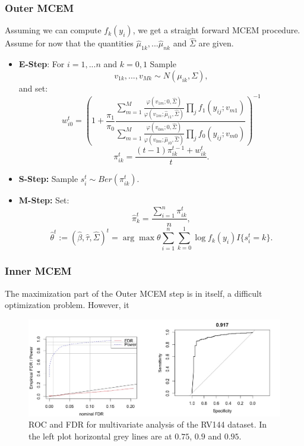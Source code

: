 \documentclass{article}\usepackage[]{graphicx}\usepackage[]{color}
\makeatletter
\def\maxwidth{ %
  \ifdim\Gin@nat@width>\linewidth
    \linewidth
  \else
    \Gin@nat@width
  \fi
}
\makeatother
\begin{document}
\subsubsection{Outer MCEM}
Assuming we can compute $f_k(y_i)$, we get a straight forward MCEM procedure. Assume for now that the quantities $\hat\mu_{1k},...\hat\mu_{nk}$ and $\hat\Sigma$ are given.  
\begin{itemize}
\item \textbf{E-Step}: For $i=1,...n$ and $k=0,1$ Sample
$$
v_{1k},...,v_{Mk} \sim N(\mu_{ik}, \Sigma),
$$
and set:
$$
w_{i0}^{t} = 
 \left(1 + \frac{\pi_1}{\pi_0}
\frac{\sum_{m=1}^{M} \frac{\varphi(v_{1m};0,\hat\Sigma)}{\varphi(v_{1m}; \hat\mu_{i1}, \hat\Sigma)}\prod_{j} f_1(y_{ij} ; v_{m1})}
{\sum_{m=1}^{M}\frac{\varphi(v_{0m};0,\hat\Sigma)}{\varphi(v_{0m}; \hat\mu_{i0}, \hat\Sigma)} \prod_{j} f_0(y_{ij} ; v_{m0})} 
\right)^{-1} 
$$$$
\pi_{ik}^t = \frac{(t - 1)\pi_{ik}^{t-1} + w_{ik}^{t}}{t}.
$$

\item \textbf{S-Step:} Sample $s_{i}^t \sim Ber(\pi_{ik}^t)$.

\item \textbf{M-Step:} Set:
$$
\hat\pi^t_k = \frac{\sum_{i=1}^{n} \pi_{ik}^t}{n},
$$$$
\hat\theta^t := (\hat \beta, \hat\tau,\hat\Sigma)^t =\arg\max{\theta} \sum_{i=1}^{n} \sum_{k=0}^{1} \log f_k(y_i) I\{s_{i}^{t} = k\}.
$$
\end{itemize}



\subsubsection{Inner MCEM}
The maximization part of the Outer MCEM step is in itself, a difficult optimization problem. However, it 







\begin{figure}
\includegraphics[width=\maxwidth]{figures/multivariateGLMERrocFDR} \caption[]{ROC and FDR for multivariate analysis of the RV144 dataset. In the left plot horizontal grey lines are at $0.75$, $0.9$ and $0.95$.}
\label{IL4}
\end{figure}
\end{document}
